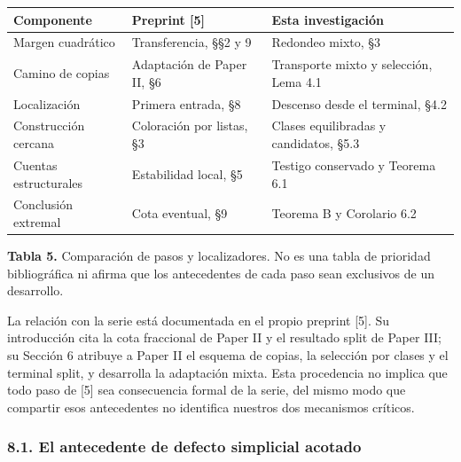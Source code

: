 \documentclass[spanish,11pt,a4paper]{article}
\newcounter{none}
\begin{document}

{\def\LTcaptype{none} %
\begin{longtable}[c]{@{}
  >{\raggedright\arraybackslash}p{}
  >{\raggedright\arraybackslash}p{}
  >{\raggedright\arraybackslash}p{}@{}}
\toprule\noalign{}
\begin{minipage}[b]{\linewidth}\raggedright
Componente
\end{minipage} & \begin{minipage}[b]{\linewidth}\raggedright
Preprint {[}5{]}
\end{minipage} & \begin{minipage}[b]{\linewidth}\raggedright
Esta investigación
\end{minipage} \\
\midrule\noalign{}
\endhead
\bottomrule\noalign{}
\endlastfoot
Margen cuadrático & Transferencia, §§2 y 9 & Redondeo mixto, §3 \\
Camino de copias & Adaptación de Paper II, §6 & Transporte mixto y selección, Lema 4.1 \\
Localización & Primera entrada, §8 & Descenso desde el terminal, §4.2 \\
Construcción cercana & Coloración por listas, §3 & Clases equilibradas y candidatos, §5.3 \\
Cuentas estructurales & Estabilidad local, §5 & Testigo conservado y Teorema 6.1 \\
Conclusión extremal & Cota eventual, §9 & Teorema B y Corolario 6.2 \\
\end{longtable}
}

\textbf{Tabla 5.} Comparación de pasos y localizadores. No es una tabla de prioridad bibliográfica ni afirma que los antecedentes de cada paso sean exclusivos de un desarrollo.

La relación con la serie está documentada en el propio preprint {[}5{]}. Su introducción cita la cota fraccional de Paper II y el resultado split de Paper III; su Sección 6 atribuye a Paper II el esquema de copias, la selección por clases y el terminal split, y desarrolla la adaptación mixta. Esta procedencia no implica que todo paso de {[}5{]} sea consecuencia formal de la serie, del mismo modo que compartir esos antecedentes no identifica nuestros dos mecanismos críticos.

\subsubsection{8.1. El antecedente de defecto simplicial acotado}\label{el-antecedente-de-defecto-simplicial-acotado}
\end{document}
